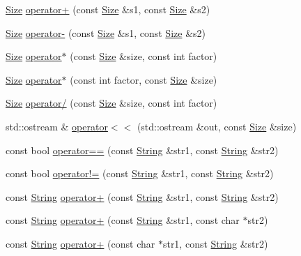 \begin{DoxyCompactItemize}
\item 
\hyperlink{classprism_1_1_size}{Size} \hyperlink{namespaceprism_a7141aeb35db81548155e44d60c05530e}{operator+} (const \hyperlink{classprism_1_1_size}{Size} \&s1, const \hyperlink{classprism_1_1_size}{Size} \&s2)
\item 
\hyperlink{classprism_1_1_size}{Size} \hyperlink{namespaceprism_ab170e3ca42d85a6766cbc7950ddfb0c4}{operator-\/} (const \hyperlink{classprism_1_1_size}{Size} \&s1, const \hyperlink{classprism_1_1_size}{Size} \&s2)
\item 
\hyperlink{classprism_1_1_size}{Size} \hyperlink{namespaceprism_a3d8e53ee3208e09e8736a77be3f485c9}{operator$\ast$} (const \hyperlink{classprism_1_1_size}{Size} \&size, const int factor)
\item 
\hyperlink{classprism_1_1_size}{Size} \hyperlink{namespaceprism_acd79758984cccce0dddfb459af65f6e1}{operator$\ast$} (const int factor, const \hyperlink{classprism_1_1_size}{Size} \&size)
\item 
\hyperlink{classprism_1_1_size}{Size} \hyperlink{namespaceprism_ad7e100bd6b1730deaab53d1218e29a67}{operator/} (const \hyperlink{classprism_1_1_size}{Size} \&size, const int factor)
\item 
std\+::ostream \& \hyperlink{namespaceprism_ad6335168e27f481d86ae42da444006d1}{operator$<$$<$} (std\+::ostream \&out, const \hyperlink{classprism_1_1_size}{Size} \&size)
\item 
const bool \hyperlink{namespaceprism_a0e7bfee93ae735b5af7e566ddd8c4f65}{operator==} (const \hyperlink{classprism_1_1_string}{String} \&str1, const \hyperlink{classprism_1_1_string}{String} \&str2)
\item 
const bool \hyperlink{namespaceprism_a5c2215edf9ab445c3c1791217d131b15}{operator!=} (const \hyperlink{classprism_1_1_string}{String} \&str1, const \hyperlink{classprism_1_1_string}{String} \&str2)
\item 
const \hyperlink{classprism_1_1_string}{String} \hyperlink{namespaceprism_a433f7afd310d95a93cf8c03d1f831812}{operator+} (const \hyperlink{classprism_1_1_string}{String} \&str1, const \hyperlink{classprism_1_1_string}{String} \&str2)
\item 
const \hyperlink{classprism_1_1_string}{String} \hyperlink{namespaceprism_a50879e9455a36b7762514951ca0f47f7}{operator+} (const \hyperlink{classprism_1_1_string}{String} \&str1, const char $\ast$str2)
\item 
const \hyperlink{classprism_1_1_string}{String} \hyperlink{namespaceprism_a7d59729f69eafd3bc9f4d30ad9dd06b6}{operator+} (const char $\ast$str1, const \hyperlink{classprism_1_1_string}{String} \&str2)

\end{DoxyCompactItemize}
